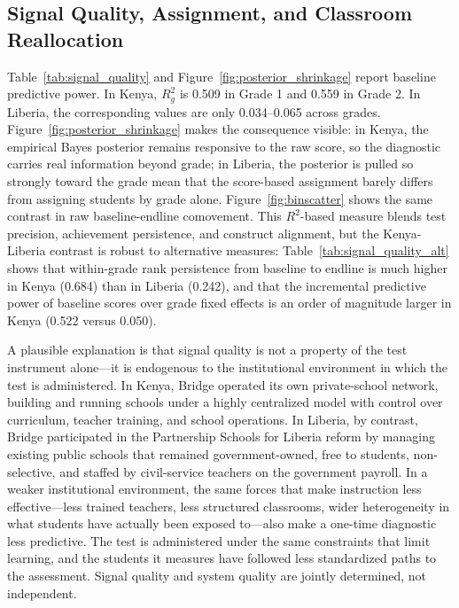 \documentclass[11pt]{article}
\begin{document}
\subsection{Signal Quality, Assignment, and Classroom Reallocation}

Table~\ref{tab:signal_quality} and Figure~\ref{fig:posterior_shrinkage} report baseline predictive power. In Kenya, $R^2_g$ is 0.509 in Grade 1 and 0.559 in Grade 2. In Liberia, the corresponding values are only 0.034--0.065 across grades. Figure~\ref{fig:posterior_shrinkage} makes the consequence visible: in Kenya, the empirical Bayes posterior remains responsive to the raw score, so the diagnostic carries real information beyond grade; in Liberia, the posterior is pulled so strongly toward the grade mean that the score-based assignment barely differs from assigning students by grade alone. Figure~\ref{fig:binscatter} shows the same contrast in raw baseline-endline comovement. This $R^2$-based measure blends test precision, achievement persistence, and construct alignment, but the Kenya-Liberia contrast is robust to alternative measures: Table~\ref{tab:signal_quality_alt} shows that within-grade rank persistence from baseline to endline is much higher in Kenya (0.684) than in Liberia (0.242), and that the incremental predictive power of baseline scores over grade fixed effects is an order of magnitude larger in Kenya (0.522 versus 0.050).

A plausible explanation is that signal quality is not a property of the test instrument alone---it is endogenous to the institutional environment in which the test is administered. In Kenya, Bridge operated its own private-school network, building and running schools under a highly centralized model with control over curriculum, teacher training, and school operations. In Liberia, by contrast, Bridge participated in the Partnership Schools for Liberia reform by managing existing public schools that remained government-owned, free to students, non-selective, and staffed by civil-service teachers on the government payroll. In a weaker institutional environment, the same forces that make instruction less effective---less trained teachers, less structured classrooms, wider heterogeneity in what students have actually been exposed to---also make a one-time diagnostic less predictive. The test is administered under the same constraints that limit learning, and the students it measures have followed less standardized paths to the assessment. Signal quality and system quality are jointly determined, not independent.
\end{document}
